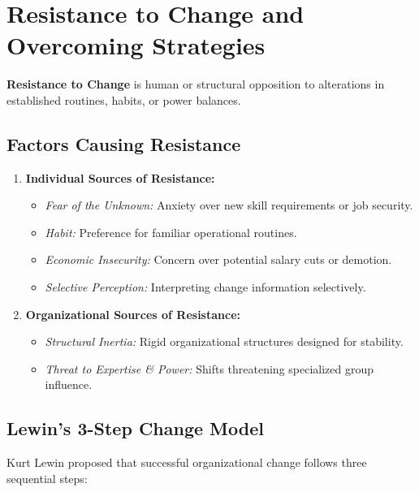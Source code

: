 \documentclass[11pt,a4paper]{article}
\begin{document}
\section{Resistance to Change and Overcoming Strategies}

\textbf{Resistance to Change} is human or structural opposition to alterations in established routines, habits, or power balances.

\subsection{Factors Causing Resistance}
\begin{enumerate}[leftmargin=*, itemsep=4pt]
  \item \textbf{Individual Sources of Resistance:}
    \begin{itemize}[leftmargin=*, noitemsep]
      \item \textit{Fear of the Unknown:} Anxiety over new skill requirements or job security.
      \item \textit{Habit:} Preference for familiar operational routines.
      \item \textit{Economic Insecurity:} Concern over potential salary cuts or demotion.
      \item \textit{Selective Perception:} Interpreting change information selectively.
    \end{itemize}
  \item \textbf{Organizational Sources of Resistance:}
    \begin{itemize}[leftmargin=*, noitemsep]
      \item \textit{Structural Inertia:} Rigid organizational structures designed for stability.
      \item \textit{Threat to Expertise \& Power:} Shifts threatening specialized group influence.
    \end{itemize}
\end{enumerate}

\subsection{Lewin's 3-Step Change Model}
Kurt Lewin proposed that successful organizational change follows three sequential steps:

\begin{tcolorbox}[tikzbox, title={Lewin's 3-Step Change Model}]
\centering
{}
\end{tcolorbox}
\end{document}
